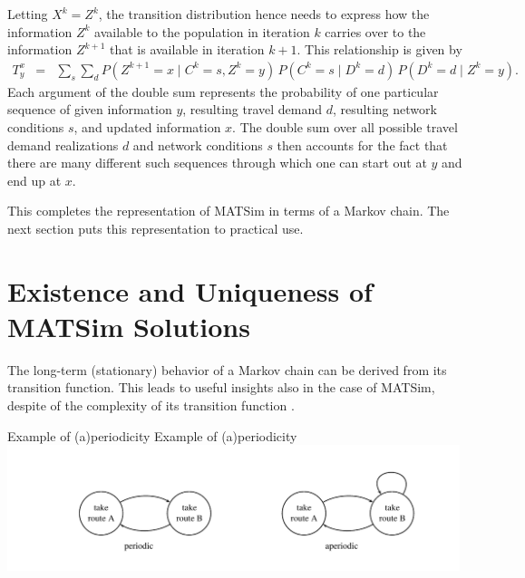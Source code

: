 Letting $X^{k}=Z^{k}$, the transition distribution hence needs to
express how the information $Z^{k}$ available to the population in
iteration $k$ carries over to the information $Z^{k+1}$ that is
available in iteration $k+1$. This relationship is given by
\begin{eqnarray}
T_{y}^{x} & = & \sum_{s}\sum_{d}
%
P(Z^{k+1}\!=\!x\mid C^{k}\!=\!s,Z^{k}\!=\!y)
\, P(C^{k}\!=\!s\mid D^{k}\!=\!d) 
\, P(D^{k}\!=\!d\mid Z^{k}\!=\!y) .\label{eq:matsim-transition-distr}
\end{eqnarray}
Each argument of the double sum represents the probability of one
particular sequence of given information $y$, resulting travel demand
$d$, resulting network conditions $s$, and updated information $x$.
The double sum over all possible travel demand realizations $d$ and
network conditions $s$ then accounts for the fact that there are
many different such sequences through which one can start out at $y$
and end up at $x$.

This completes the representation of MATSim in terms of a Markov chain.
The next section puts this representation to practical use.


\section{\label{sec:Existence-and-uniqueness}Existence and Uniqueness of
MATSim Solutions}

The long-term (stationary) behavior of a Markov chain can be derived
from its transition function. This leads to useful insights also in
the case of MATSim, despite of the complexity of its transition function
.

\createfigure%
{Example of (a)periodicity}%
{Example of (a)periodicity}%
{\label{fig:Example-of-(a)periodicity}}%
{\includegraphics[width=0.99\textwidth, angle=0]{understanding/figures/mc/fig1.pdf}}%
{}

